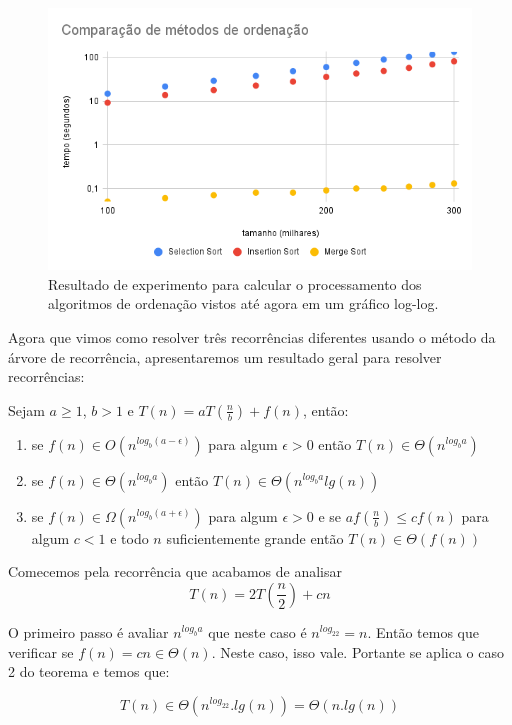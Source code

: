 \begin{figure}
  \label{fig:comp1}
  \includegraphics[width=\textwidth]{imagens/comparacao1.png}
  \caption{Resultado de experimento para calcular o processamento dos algoritmos de ordenação vistos até agora em um gráfico log-log.}
\end{figure}


Agora que vimos como resolver três recorrências diferentes usando o método da árvore de recorrência, apresentaremos um resultado geral para resolver recorrências:

\begin{theorem}[Mestre]
  Sejam $a \geq 1$, $b > 1$ e $T(n) = aT(\frac{n}{b}) + f(n)$, então:
  \begin{enumerate}
  \item se $f(n) \in O(n^{log_b(a - \epsilon)})$ para algum $\epsilon > 0$ então $T(n) \in \Theta(n^{log_ba})$
  \item se $f(n) \in \Theta(n^{log_ba})$ então $T(n) \in \Theta(n^{log_ba}lg(n))$
  \item se $f(n) \in \Omega(n^{log_b(a + \epsilon)})$ para algum $\epsilon > 0$ e se $af(\frac{n}{b}) \leq cf(n)$ para algum $c < 1$ e todo $n$ suficientemente grande então $T(n) \in \Theta(f(n))$
  \end{enumerate}
\end{theorem}

\begin{example}
  Comecemos pela recorrência que acabamos de analisar
  \begin{displaymath}
    T(n) = 2T\left(\frac{n}{2}\right) + cn
  \end{displaymath}

  O primeiro passo é avaliar $n^{log_ba}$ que neste caso é $n^{log_22} = n$.
  Então temos que verificar se $f(n) = cn \in \Theta(n)$.
  Neste caso, isso vale.
  Portante se aplica o caso 2 do teorema e temos que:

  \begin{displaymath}
    T(n) \in \Theta(n^{log_22}.lg(n)) = \Theta(n.lg(n))
  \end{displaymath}
\end{example}

